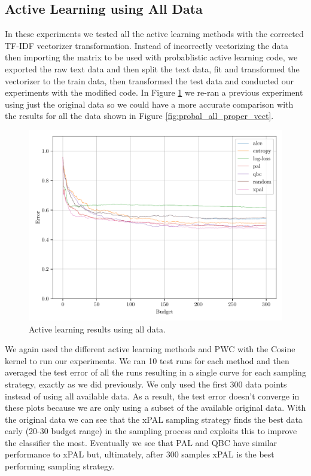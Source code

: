 \subsection{Active Learning using All Data}

In these experiments we tested all the active learning methods with the corrected TF-IDF vectorizer transformation. Instead of incorrectly vectorizing the data then importing the matrix to be used with \cite{kottke2021toward} probablistic active learning code, we exported the raw text data and then split the text data, fit and transformed the vectorizer to the train data, then transformed the test data and conducted our experiments with the modified code. In Figure \ref{fig:probal_original_proper_vect} we re-ran a previous experiment using just the original data so we could have a more accurate comparison with the results for all the data shown in Figure \ref{fig:probal_all_proper_vect}.

\begin{figure}[h]
    \centering
    \includegraphics[width=\scale\textwidth]{../img/plot_text_data_original_proper_vectorizer_test_results.pdf}
    \caption{Active learning results using all data.}
    \label{fig:probal_original_proper_vect}
\end{figure}

We again used the different active learning methods and PWC with the Cosine kernel to run our experiments. We ran 10 test runs for each method and then averaged the test error of all the runs resulting in a single curve for each sampling strategy, exactly as we did previously. We only used the first 300 data points instead of using all available data. As a result, the test error doesn't converge in these plots because we are only using a subset of the available original data. With the original data we can see that the xPAL sampling strategy finds the best data early (20-30 budget range) in the sampling process and exploits this to improve the classifier the most. Eventually we see that PAL and QBC have similar performance to xPAL but, ultimately, after 300 samples xPAL is the best performing sampling strategy.

